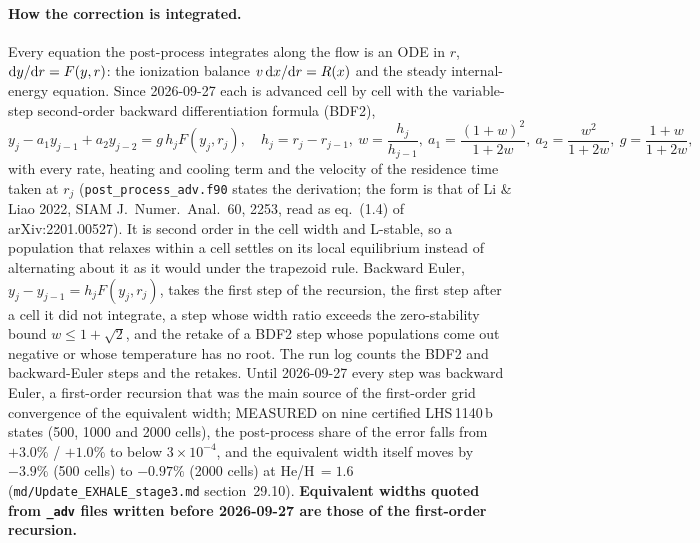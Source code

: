 \documentclass[english,a4paper]{my_memo}
\begin{document}
\paragraph{How the correction is integrated.} Every equation the
post-process integrates along the flow is an ODE in $r$, ${\rm d}y/{\rm d}r
= F(y,r)$: the ionization balance $v\,{\rm d}x/{\rm d}r=R(x)$ and the steady
internal-energy equation. Since 2026-09-27 each is advanced cell by cell with
the variable-step second-order backward differentiation formula (BDF2),
\begin{equation*}
y_j - a_1y_{j-1} + a_2y_{j-2} = g\,h_jF(y_j,r_j),\quad
h_j=r_j-r_{j-1},\ w=\frac{h_j}{h_{j-1}},\
a_1=\frac{(1+w)^2}{1+2w},\ a_2=\frac{w^2}{1+2w},\ g=\frac{1+w}{1+2w},
\end{equation*}
with every rate, heating and cooling term and the velocity of the residence
time taken at $r_j$ (\texttt{post\_process\_adv.f90} states the derivation;
the form is that of Li \& Liao 2022, SIAM J.\ Numer.\ Anal.\ 60, 2253,
read as eq.~(1.4) of arXiv:2201.00527). It is second order in
the cell width and L-stable, so a population that relaxes within a cell
settles on its local equilibrium instead of alternating about it as it would
under the trapezoid rule. Backward Euler, $y_j-y_{j-1}=h_jF(y_j,r_j)$, takes
the first step of the recursion, the first step after a cell it did not
integrate, a step whose width ratio exceeds the zero-stability bound
$w\le1+\sqrt2$, and the retake of a BDF2 step whose populations come out
negative or whose temperature has no root. The run log counts the BDF2 and
backward-Euler steps and the retakes. Until 2026-09-27 every step was backward
Euler, a first-order recursion that was the main source of the first-order
grid convergence of the equivalent width; MEASURED on nine certified
LHS\,1140\,b states (500, 1000 and 2000 cells), the post-process share of the
error falls from $+3.0\%$ / $+1.0\%$ to below $3\times10^{-4}$, and the
equivalent width itself moves by $-3.9\%$ (500 cells) to $-0.97\%$ (2000
cells) at He/H\,$=1.6$ (\texttt{md/Update\_EXHALE\_stage3.md} section~29.10).
\textbf{Equivalent widths quoted from \texttt{\_adv} files written before
2026-09-27 are those of the first-order recursion.}
\end{document}
